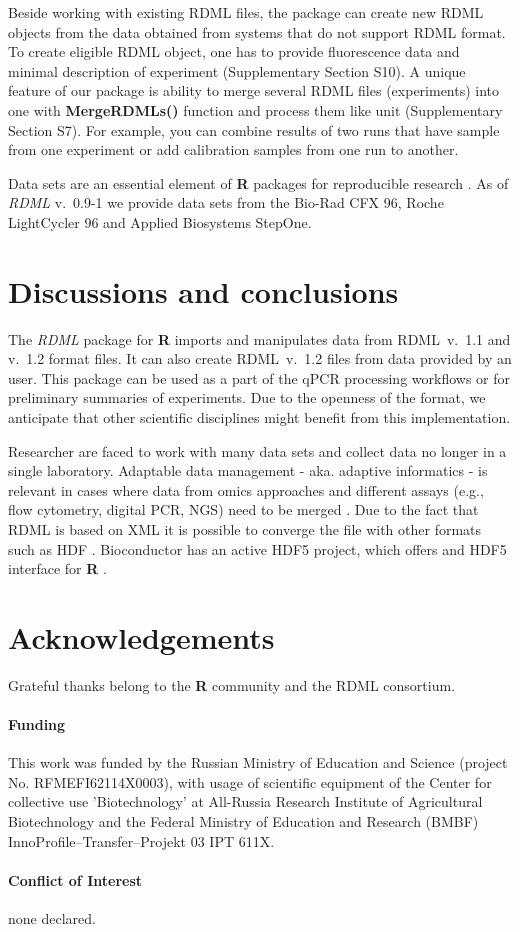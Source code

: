 \documentclass{bioinfo}
\begin{document}
	Beside working with existing RDML files, the package can create new RDML 
objects from the data obtained from systems that do not support RDML format. To 
create eligible RDML object, one has to provide fluorescence data and minimal 
description of experiment (Supplementary Section S10). A unique feature of our 
package is ability to merge several RDML files (experiments) into one with 
\textbf{MergeRDMLs()} function and process them like unit (Supplementary Section 
S7). For example, you can combine results of two runs that have sample from one 
experiment or add calibration samples from one run to another.

Data sets are an essential element of \textbf{R} packages for reproducible 
research \cite{roediger2015r}. As of \textit{RDML} v.~0.9-1 we provide data sets 
from the Bio-Rad CFX 96, Roche LightCycler 96 and Applied Biosystems StepOne.

\section{Discussions and conclusions}
	
	The \textit{RDML} package for \textbf{R} imports and manipulates data 
from RDML~v.~1.1 and v.~1.2 format files. It can also create RDML~v.~1.2 files 
from data provided by an user. This package can be used as a part of the qPCR 
processing workflows or for preliminary summaries of experiments. Due to the 
openness of the format, we anticipate that other scientific disciplines might 
benefit from this implementation.

Researcher are faced to work with many data sets and collect data no 
longer in a single laboratory. Adaptable data management - aka. adaptive 
informatics - is relevant in cases where data from omics approaches and 
different assays (e.g., flow cytometry, digital PCR, NGS) need to be merged 
\cite{baker_quantitative_2012}. Due to the fact that RDML is based on XML it is 
possible to converge the file with other formats such as HDF 
\cite{millard_adaptive_2011}. Bioconductor has an active HDF5 project, which 
offers and HDF5 interface for \textbf{R} \cite{Fischer_HDF5}.

\section{Acknowledgements}
Grateful thanks belong to the \textbf{R} community and the RDML consortium.
	
\paragraph{Funding\textcolon} This work was funded by the Russian 
Ministry of Education and Science (project No. RFMEFI62114X0003), with 
usage of scientific equipment of the Center for collective use ’Biotechnology’ at 
All-Russia Research Institute of Agricultural Biotechnology and the Federal 
Ministry of Education and Research (BMBF) InnoProfile--Transfer--Projekt 03 IPT 
611X.
	
\paragraph{Conflict of Interest\textcolon} none declared.

%
%
%
%
%
%

%

\end{document}
